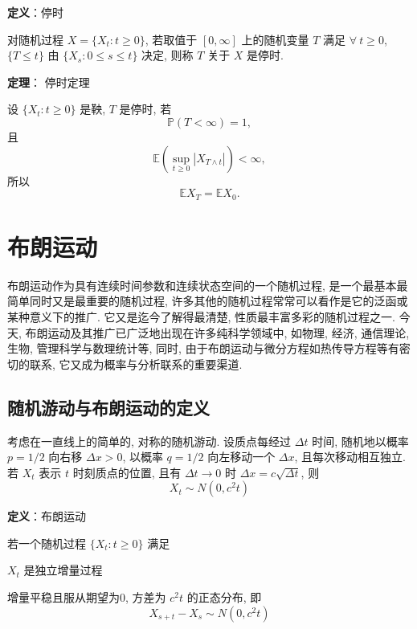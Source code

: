 \documentclass[openany]{ctexbook}
\theoremstyle{kaiti}
\theoremstyle{normal}
\begin{document}
\textbf{定义}：停时

对随机过程 $X=\{X_t:t\geqslant0\}$, 若取值于 $[0,\infty]$ 上的随机变量 $T$ 满足 $\forall~t\geqslant0$, $\{T\leqslant t\}$ 由 $\{X_s:0\leqslant s\leqslant t\}$ 决定, 则称 $T$ 关于 $X$ 是停时.

\textbf{定理}： 停时定理

设 $\{X_t:t\geqslant0\}$ 是鞅, $T$ 是停时, 若
\begin{equation}
  \mathbb{P}(T<\infty)=1,
\end{equation}
且 
\begin{equation}
  \mathbb{E}\left(\sup_{t\geqslant0}|X_{T\wedge t}|\right)<\infty,
\end{equation} 
所以 
\begin{equation}
  \mathbb{E}X_T=\mathbb{E}X_0.
\end{equation}

\chapter{布朗运动}

布朗运动作为具有连续时间参数和连续状态空间的一个随机过程, 是一个最基本最简单同时又是最重要的随机过程, 许多其他的随机过程常常可以看作是它的泛函或某种意义下的推广. 它又是迄今了解得最清楚, 性质最丰富多彩的随机过程之一. 今天, 布朗运动及其推广已广泛地出现在许多纯科学领域中, 如物理, 经济, 通信理论, 生物, 管理科学与数理统计等, 同时, 由于布朗运动与微分方程如热传导方程等有密切的联系, 它又成为概率与分析联系的重要渠道.

\section{随机游动与布朗运动的定义}

考虑在一直线上的简单的, 对称的随机游动. 设质点每经过 $\Delta t$ 时间, 随机地以概率 $p=1/2$ 向右移 $\Delta x>0$, 以概率 $q=1/2$ 向左移动一个 $\Delta x$, 且每次移动相互独立. 若 $X_t$ 表示 $t$ 时刻质点的位置, 且有 $\Delta t\to0$ 时 $\Delta x=c\sqrt{\Delta t}$, 则
\begin{equation}
  X_t\sim N(0,c^2t)
\end{equation}

\textbf{定义}：布朗运动

若一个随机过程 $\{X_t:t\geqslant0\}$ 满足

$X_t$ 是独立增量过程

增量平稳且服从期望为0, 方差为 $c^2t$ 的正态分布, 即
\begin{equation}
  X_{s+t}-X_s\sim N(0,c^2t)
\end{equation}
\end{document}
